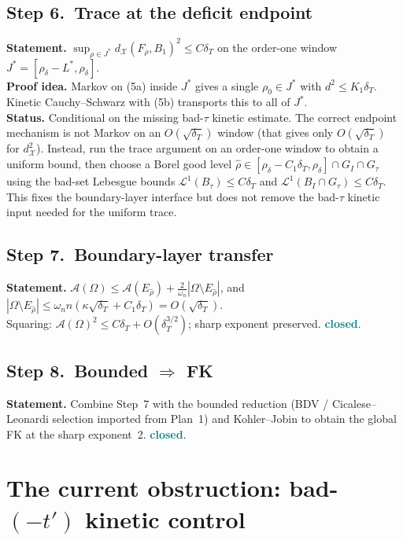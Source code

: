 \documentclass[11pt]{article}
\theoremstyle{definition}
\newcommand{\Om}{\Omega}
\newcommand{\Fr}{\mathcal{A}}
\newcommand{\X}{\mathcal X}
\newcommand{\rdel}{\rho_\delta}
\newcommand{\rhad}{\widehat\rho}
\newcommand{\CLOSED}{\textcolor{teal}{\bf closed}}
\begin{document}
\subsection*{Step 6.\ Trace at the deficit endpoint}\label{step:6}
\textbf{Statement.}  $\sup_{\rho\in J^{*}}d_{\X}(F_{\rho},B_{1})^{2}\le C\delta_{T}$
on the order-one window $J^{*}=[\rdel-L^{*},\rdel]$.\\
\textbf{Proof idea.}  Markov on (5a) inside $J^{*}$ gives a single
$\rho_{0}\in J^{*}$ with $d^{2}\le K_{1}\delta_{T}$.  Kinetic
Cauchy--Schwarz with (5b) transports this to all of $J^{*}$.\\
\textbf{Status.}  Conditional on the missing bad-$\tau$ kinetic
estimate.  The correct endpoint mechanism is not Markov on an
$O(\sqrt{\delta_T})$ window (that gives only $O(\sqrt{\delta_T})$ for
$d_{\X}^{2}$).  Instead, run the trace argument on an order-one window
to obtain a uniform bound, then choose a Borel good level
$\rhad\in[\rdel-C_{1}\delta_{T},\rdel]\cap G_{I}\cap G_{\tau}$ using
the bad-set Lebesgue bounds
$\mathcal L^{1}(B_{\tau})\le C\delta_{T}$ and
$\mathcal L^{1}(B_{I}\cap G_{\tau})\le C\delta_{T}$.  This fixes the
boundary-layer interface but does not remove the bad-$\tau$ kinetic
input needed for the uniform trace.

\subsection*{Step 7.\ Boundary-layer transfer}\label{step:7}
\textbf{Statement.}
$\Fr(\Om)\le\Fr(E_{\rhad})+\frac{2}{\omega_{n}}|\Om\setminus E_{\rhad}|$,
and $|\Om\setminus E_{\rhad}|\le\omega_{n}n(\kappa\sqrt{\delta_{T}}+C_{1}\delta_{T})
=O(\sqrt{\delta_{T}})$.\\
Squaring: $\Fr(\Om)^{2}\le C\delta_{T}+O(\delta_{T}^{3/2})$; sharp
exponent preserved. \CLOSED.

\subsection*{Step 8.\ Bounded $\Rightarrow$ FK}\label{step:8}
\textbf{Statement.}  Combine Step~7 with the bounded reduction (BDV /
Cicalese--Leonardi selection imported from Plan~1) and Kohler--Jobin
to obtain the global FK at the sharp exponent~2. \CLOSED.

\section{The current obstruction: bad-$(-t')$ kinetic control}
\label{sec:bad-tau}
\end{document}
